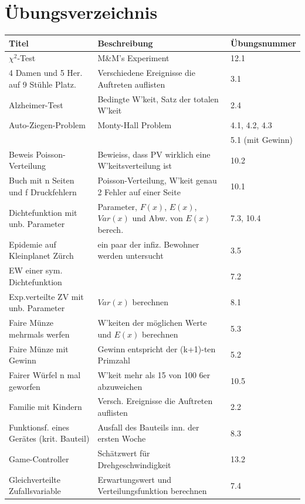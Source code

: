 \section{Übungsverzeichnis}
\begin{center}
\begin{tabular}{|l|l|l|}
\hline
\textbf{Titel} & \textbf{Beschreibung} & \textbf{Übungsnummer} \\ \hline
$\chi^2$-Test & M\&M's Experiment & 12.1 \\ \hline
4 Damen und 5 Her. auf 9 Stühle Platz. & Verschiedene Ereignisse die Auftreten auflisten & 3.1 \\ \hline
Alzheimer-Test & Bedingte W'keit, Satz der totalen W'keit & 2.4 \\ \hline
Auto-Ziegen-Problem & Monty-Hall Problem & 4.1, 4.2, 4.3 \\ & & 5.1 (mit Gewinn) \\ \hline
Beweis Poisson-Verteilung & Bewieiss, dass PV wirklich eine W'keitsverteilung ist & 10.2 \\ \hline
Buch mit n Seiten und f Druckfehlern & Poisson-Verteilung, W'keit genau 2 Fehler auf einer Seite & 10.1 \\ \hline
Dichtefunktion mit unb. Parameter & Parameter, $F(x)$, $E(x)$, $Var(x)$ und Abw. von $E(x)$ berech. & 7.3, 10.4 \\ \hline
Epidemie auf Kleinplanet Zürch & ein paar der infiz. Bewohner werden untersucht & 3.5 \\ \hline
EW einer sym. Dichtefunktion & & 7.2 \\ \hline
Exp.verteilte ZV mit unb. Parameter & $Var(x)$ berechnen & 8.1 \\ \hline
Faire Münze mehrmals werfen & W'keiten der möglichen Werte und $E(x)$ berechnen & 5.3 \\ \hline 
Faire Münze mit Gewinn & Gewinn entspricht der (k+1)-ten Primzahl & 5.2 \\ \hline
Fairer Würfel n mal geworfen & W'keit mehr als 15 von 100 6er abzuweichen & 10.5 \\ \hline
Familie mit Kindern & Versch. Ereignisse die Auftreten auflisten & 2.2 \\ \hline
Funktionsf. eines Gerätes (krit. Bauteil) & Ausfall des Bauteils inn. der ersten Woche & 8.3 \\ \hline
Game-Controller & Schätzwert für Drehgeschwindigkeit & 13.2 \\ \hline
Gleichverteilte Zufallsvariable & Erwartungswert und Verteilungsfunktion berechnen & 7.4 \\ \hline

\end{tabular}
\end{center}
